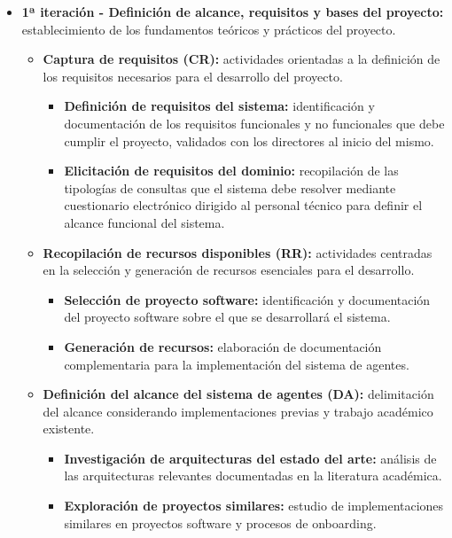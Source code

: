 \begin{itemize}
  \item\textbf{1ª iteración - Definición de alcance, requisitos y bases del proyecto: }establecimiento de los fundamentos teóricos y prácticos del proyecto.
    \begin{itemize}
      \item\textbf{Captura de requisitos (CR):} actividades orientadas a la definición de los requisitos necesarios para el desarrollo del proyecto.
            \begin{itemize}
          \item\textbf{Definición de requisitos del sistema:} identificación y documentación de los requisitos funcionales y no funcionales que debe cumplir el proyecto, validados con los directores al inicio del mismo.
          \item\textbf{Elicitación de requisitos del dominio:} recopilación de las tipologías de consultas que el sistema debe resolver mediante cuestionario electrónico dirigido al personal técnico para definir el alcance funcional del sistema.
        \end{itemize}
      \item\textbf{Recopilación de recursos disponibles (RR):} actividades centradas en la selección y generación de recursos esenciales para el desarrollo.
        \begin{itemize}
          \item\textbf{Selección de proyecto software:} identificación y documentación del proyecto software sobre el que se desarrollará el sistema.
          \item\textbf{Generación de recursos:} elaboración de documentación complementaria para la implementación del sistema de agentes.
        \end{itemize}
      \item\textbf{Definición del alcance del sistema de agentes (DA):} delimitación del alcance considerando implementaciones previas y trabajo académico existente.
    \begin{itemize}
          \item\textbf{Investigación de arquitecturas del estado del arte:} análisis de las arquitecturas relevantes documentadas en la literatura académica.
          \item\textbf{Exploración de proyectos similares:} estudio de implementaciones similares en proyectos software y procesos de onboarding.
    \end{itemize}
      \end{itemize}

\end{itemize}
